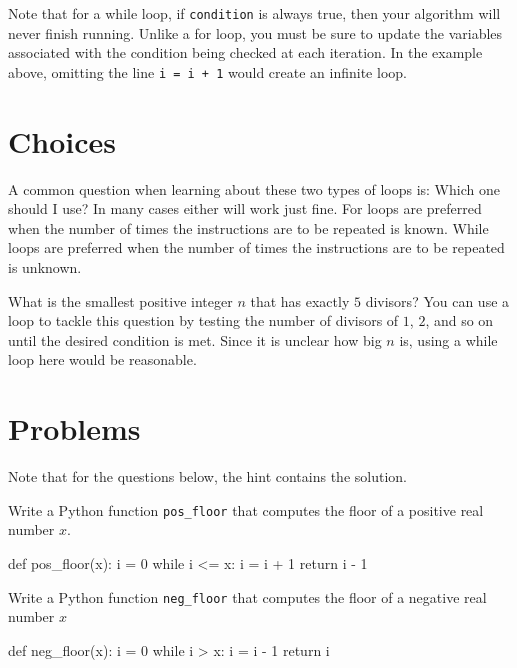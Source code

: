 \documentclass{ximera}
\begin{document}
Note that for a while loop, if \verb|condition| is always true, then your algorithm will never finish running. Unlike a for loop, you must be sure to update the variables associated with the condition being checked at each iteration. In the example above, omitting the line \verb|i = i + 1| would create an infinite loop.

\section{Choices}

A common question when learning about these two types of loops is: Which one should I use? In many cases either will work just fine. For loops are preferred when the number of times the instructions are to be repeated is known. While loops are preferred when the number of times the instructions are to be repeated is unknown.

What is the smallest positive integer $n$ that has exactly $5$ divisors? You can use a loop to tackle this question by testing the number of divisors of $1$, $2$, and so on until the desired condition is met. Since it is unclear how big $n$ is, using a while loop here would be reasonable.

\section{Problems}

Note that for the questions below, the hint contains the solution.

\begin{question}
	Write a Python function \verb|pos_floor| that computes the floor of a positive real number $x$.
\begin{hint}
\begin{sageCell}
def pos_floor(x):
        i = 0
        while i <= x:
                i = i + 1
        return i - 1
\end{sageCell}
\end{hint}
\end{question}

\begin{question}
	Write a Python function \verb|neg_floor| that computes the floor of a negative real number $x$
\begin{hint}
\begin{sageCell}
def neg_floor(x):
        i = 0
        while i > x:
                i = i - 1
        return i
\end{sageCell}
\end{hint}
\end{question}
\end{document}
